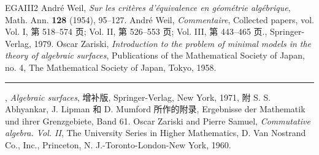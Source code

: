 \begin{thebibliography}{EGAIII2}
 André Weil, \emph{Sur les critères d'équivalence en géométrie algébrique}, Math. Ann. \textbf{128} (1954), 95--127.
 André Weil, \emph{Commentaire}, Collected papers, vol. Vol. I, 第 518--574 页; Vol. II, 第 526--553 页; Vol. III, 第 443--465 页., Springer-Verlag, 1979.
 Oscar Zariski, \emph{Introduction to the problem of minimal models in the theory of algebraic surfaces}, Publications of the Mathematical Society of Japan, no. 4, The Mathematical Society of Japan, Tokyo, 1958.
 \rule{2em}{.3pt}, \emph{Algebraic surfaces}, 增补版, Springer-Verlag, New York, 1971, 附 S. S. Abhyankar, J. Lipman 和 D. Mumford 所作的附录, Ergebnisse der Mathematik und ihrer Grenzgebiete, Band 61.
 Oscar Zariski and Pierre Samuel, \emph{Commutative algebra. Vol. II}, The University Series in Higher Mathematics, D. Van Nostrand Co., Inc., Princeton, N. J.-Toronto-London-New York, 1960.
\end{thebibliography}

